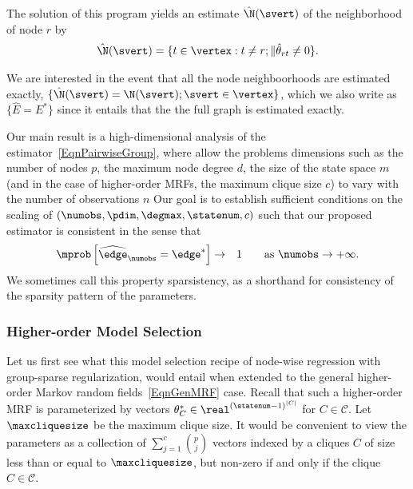 The solution of this program yields an estimate $\hat{\N}(\svert)$ of the neighborhood of node $r$ by 
\begin{align*}
	\hat{\N}(\svert) = \{t \in \vertex : t \neq r ; \| \hat{\theta}_{rt} \neq 0\}. 
\end{align*}

We are interested in the event that all the node neighboorhoods are estimated exactly, $\{\hat{\N}(\svert) = \N(\svert); \svert \in \vertex\}$,
which we also write as $\{\hat{E} = E^*\}$ since it entails that the the full graph is estimated exactly.


Our main result is a high-dimensional analysis of the estimator~\eqref{EqnPairwiseGroup}, where allow the problems dimensions such as the number of nodes $p$,
the maximum node degree $d$, the size of the state space $m$ (and in the case of higher-order MRFs, the maximum clique size $c$) to vary with the number of observations $n$  Our goal is to establish sufficient conditions on the scaling of $(\numobs, \pdim, \degmax, \statenum, c)$ such that our proposed estimator is consistent in the sense that
\begin{eqnarray*}
\mprob \left[\widehat{\edge}_\numobs = \edge^* \right] & \rightarrow &
1 \qquad \mbox{as $\numobs \rightarrow +\infty$}.
\end{eqnarray*}
We sometimes call this property sparsistency, as a shorthand for consistency of the sparsity pattern of the parameters.

\subsubsection{Higher-order Model Selection}

Let us first see what this model selection recipe of node-wise regression with group-sparse regularization, would entail when extended to the general higher-order Markov random fields~\eqref{EqnGenMRF} case.  Recall that such a higher-order MRF  is parameterized by vectors $\theta^*_{C} \in \real^{(\statenum - 1)^{|C|}}$ for $C \in \mathcal{C}$. Let $\maxcliquesize$ be the maximum clique size. It would be convenient to view the parameters as a collection of $\sum_{j=1}^{c} \binom{p}{j}$ vectors indexed by a cliques $C$ of size less than or equal to $\maxcliquesize$, but non-zero if and only if the clique $C \in \mathcal{C}$. 

